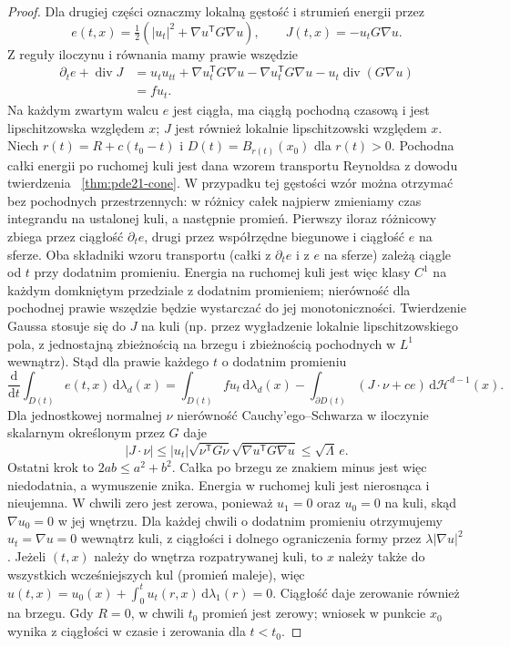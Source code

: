 \begin{proof}
Dla drugiej części oznaczmy lokalną gęstość i strumień
energii przez
\[
 e(t,x)=\tfrac12(|u_t|^2+\nabla u^\mathsf TG\nabla u),
 \qquad J(t,x)=-u_tG\nabla u.
\]
Z reguły iloczynu i równania mamy prawie wszędzie
\[
 \begin{split}
 \partial_te+\operatorname{div}J
 &=u_tu_{tt}+\nabla u_t^\mathsf TG\nabla u
   -\nabla u_t^\mathsf TG\nabla u
   -u_t\operatorname{div}(G\nabla u)\\
 &=f u_t.
 \end{split}
\]
Na każdym zwartym walcu $e$ jest ciągła, ma ciągłą
pochodną czasową i jest lipschitzowska względem $x$;
$J$ jest również lokalnie lipschitzowski względem $x$.
Niech $r(t)=R+c(t_0-t)$ i $D(t)=B_{r(t)}(x_0)$
dla $r(t)>0$.
Pochodna całki energii po ruchomej kuli jest dana
wzorem transportu Reynoldsa z dowodu twierdzenia
~\ref{thm:pde21-cone}. W przypadku tej gęstości
wzór można otrzymać bez pochodnych przestrzennych:
w różnicy całek najpierw zmieniamy czas integrandu
na ustalonej kuli, a następnie promień.
Pierwszy iloraz różnicowy zbiega przez ciągłość
$\partial_te$, drugi przez współrzędne biegunowe
i ciągłość $e$ na sferze. Oba składniki wzoru
transportu (całki z $\partial_te$ i z $e$ na sferze)
zależą ciągle od $t$ przy dodatnim promieniu.
Energia na ruchomej kuli jest więc klasy $C^1$
na każdym domkniętym przedziale z dodatnim
promieniem; nierówność dla pochodnej prawie
wszędzie będzie wystarczać do jej monotoniczności. Twierdzenie Gaussa stosuje
się do $J$ na kuli (np. przez wygładzenie lokalnie
lipschitzowskiego pola, z jednostajną zbieżnością
na brzegu i zbieżnością pochodnych w $L^1$ wewnątrz).
Stąd dla prawie każdego $t$ o dodatnim promieniu
\[
 \frac{\mathrm d}{\mathrm dt}\int_{D(t)}e(t,x)
 \,\mathrm d\lambda_d(x)
 =\int_{D(t)}fu_t\,\mathrm d\lambda_d(x)
 -\int_{\partial D(t)}(J\cdot\nu+ce)
 \,\mathrm d\mathcal H^{d-1}(x).
\]
Dla jednostkowej normalnej $\nu$ nierówność
Cauchy'ego--Schwarza w iloczynie skalarnym określonym
przez $G$ daje
\[
 |J\cdot\nu|\le |u_t|\sqrt{\nu^\mathsf TG\nu}
                     \sqrt{\nabla u^\mathsf TG\nabla u}
 \le\sqrt{\Lambda}\,e.
\]
Ostatni krok to $2ab\le a^2+b^2$.
Całka po brzegu ze znakiem minus jest więc niedodatnia,
a wymuszenie znika. Energia w ruchomej kuli jest
nierosnąca i nieujemna. W chwili zero jest zerowa,
ponieważ $u_1=0$ oraz $u_0=0$ na kuli, skąd
$\nabla u_0=0$ w jej wnętrzu.
Dla każdej chwili o dodatnim promieniu otrzymujemy
$u_t=\nabla u=0$ wewnątrz kuli, z ciągłości i dolnego
ograniczenia formy przez $\lambda|\nabla u|^2$.
Jeżeli $(t,x)$ należy do wnętrza rozpatrywanej kuli,
to $x$ należy także do wszystkich wcześniejszych
kul (promień maleje), więc
$u(t,x)=u_0(x)+\int_0^t u_t(r,x)\,\mathrm d\lambda_1(r)=0$.
Ciągłość daje zerowanie również na brzegu.
Gdy $R=0$, w chwili $t_0$ promień jest zerowy;
wniosek w punkcie $x_0$ wynika z ciągłości w czasie
i zerowania dla $t<t_0$.
\end{proof}

